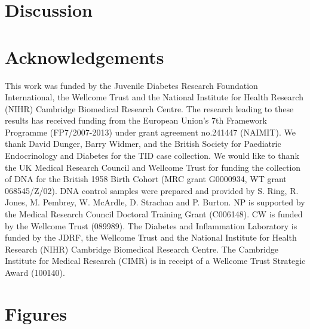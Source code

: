 \documentclass[12pt,a4paper,twoside]{article}
\begin{document}
\section{Discussion}


\section{Acknowledgements}

This work was funded by the Juvenile Diabetes Research Foundation International, the Wellcome Trust and the National Institute for Health Research (NIHR) Cambridge Biomedical Research Centre.
The research leading to these results has received funding from the European Union's 7th Framework Programme (FP7/2007-2013) under grant agreement no.241447 (NAIMIT).
We thank David Dunger, Barry Widmer, and the British Society for Paediatric Endocrinology and Diabetes for the TID case collection.  
We would like to thank the UK Medical Research Council and Wellcome Trust for funding the collection of DNA for the British 1958 Birth Cohort (MRC grant G0000934, WT grant 068545/Z/02).
DNA control samples were prepared and provided by S. Ring, R. Jones, M. Pembrey, W. McArdle, D. Strachan and P. Burton. 
NP is supported by the Medical Research Council Doctoral Training Grant (C006148).
CW is funded by the Wellcome Trust (089989).
The Diabetes and Inflammation Laboratory is funded by the JDRF, the Wellcome Trust and the National Institute for Health Research (NIHR) Cambridge Biomedical Research Centre.
The Cambridge Institute for Medical Research (CIMR) is in receipt of a Wellcome Trust Strategic Award (100140).

\singlespacing
\footnotesize


%
%
%
%
%
%






\clearpage


\section*{Figures}

\FloatBarrier

\clearpage

%
\FloatBarrier



%
\end{document}
